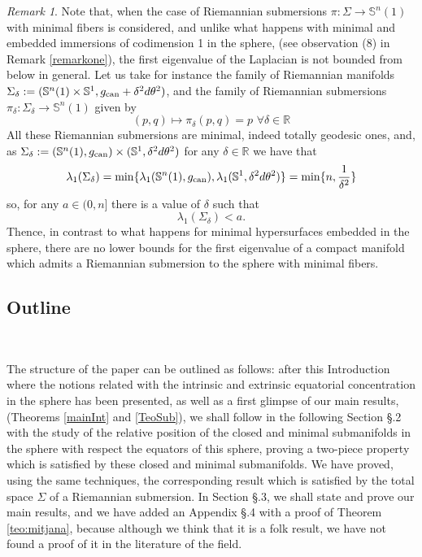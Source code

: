 \documentclass{amsart}
\theoremstyle{definition}
\theoremstyle{remark}
\newtheorem{remark}[theorem]{Remark}
\newcommand{\erre}{\mathbb{R}}
\newcommand{\ese}{\mathbb{S}}
\begin{document}
\begin{remark}
Note that, when the case of Riemannian submersions $\pi: \Sigma \rightarrow \ese^n(1)$ with minimal fibers is considered, and unlike what happens with minimal and embedded immersions of codimension 1 in the sphere, (see observation (8) in Remark \ref{remarkone}), the first eigenvalue of the Laplacian is not bounded from below in general. 
Let us take for instance the family of Riemannian manifolds $\Sigma_\delta:=(\mathbb{S}^n(1)\times \mathbb{S}^1, g_{\rm can}+\delta^2d\theta^2)$, and the family of Riemannian submersions $\pi_\delta: \Sigma_\delta \rightarrow \ese^n(1)$ given by
$$
(p,q)\mapsto \pi_\delta(p,q)=p \,\,\forall \delta \in \erre
$$
All these Riemannian submersions are minimal, indeed totally geodesic ones, and, as $\Sigma_\delta:=(\mathbb{S}^n(1),g_{\rm can}) \times (\mathbb{S}^1,\delta^2d\theta^2)$  for any $\delta \in \erre$ we have that
$$\lambda_1(\Sigma_\delta)={\rm min}\{\lambda_1(\mathbb{S}^n(1),g_{\rm can}),\lambda_1(\mathbb{S}^1,\delta^2d\theta^2)\}={\rm min}\{n, \frac{1}{\delta^2}\}$$
\noindent so, for any $a\in (0,n]$ there is a value of $\delta$ such that
$$
\lambda_1(\Sigma_\delta)<a.
$$
Thence, in contrast to what happens for minimal hypersurfaces embedded in the sphere, there are no lower bounds for the first eigenvalue of a compact manifold which admits a Riemannian submersion to the sphere with minimal fibers.
\end{remark}

\subsection{Outline}\

The structure of the paper can be outlined as follows: after this Introduction where the notions related with the intrinsic and extrinsic equatorial concentration in the sphere has been presented, as well as a first glimpse of our main results, (Theorems \ref{mainInt} and \ref{TeoSub}), we shall follow in the following Section \S.2 with the study of the relative position of the closed and minimal submanifolds in the sphere with respect the equators of this sphere, proving a two-piece property which is satisfied by these closed and minimal submanifolds. We have proved, using the same techniques, the corresponding result which is satisfied by the total space $\Sigma$ of a Riemannian submersion. In Section \S.3, we shall state and prove our main results, and we have added an Appendix \S.4 with a proof of Theorem \ref{teo:mitjana}, because although we think that it is a folk result, we have not found a proof of it in the literature of the field.
\end{document}
